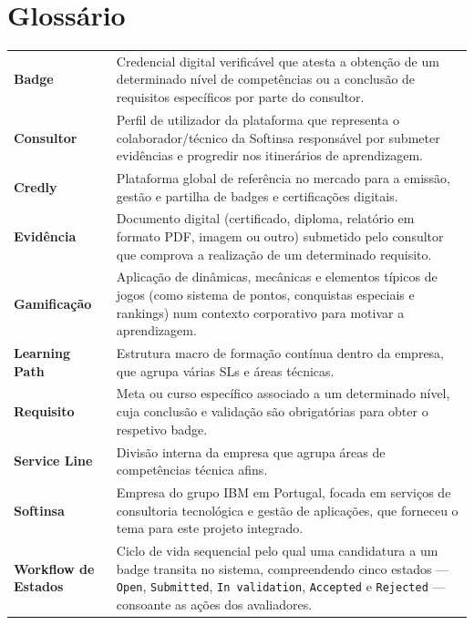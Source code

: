 \documentclass[12pt,a4paper]{report}
\begin{document}
\newpage

\chapter*{Glossário}

\begin{tabularx}{\textwidth}{@{}l@{\hspace{1em}}X@{}}
  \textbf{\color{secondary}Badge}                & Credencial digital verificável que atesta a obtenção de um determinado nível de competências ou a conclusão de requisitos específicos por parte do consultor. \\[6pt]
  \textbf{\color{secondary}Consultor}             & Perfil de utilizador da plataforma que representa o colaborador/técnico da Softinsa responsável por submeter evidências e progredir nos itinerários de aprendizagem. \\[6pt]
  \textbf{\color{secondary}Credly}                & Plataforma global de referência no mercado para a emissão, gestão e partilha de badges e certificações digitais. \\[6pt]
  \textbf{\color{secondary}Evidência}             & Documento digital (certificado, diploma, relatório em formato PDF, imagem ou outro) submetido pelo consultor que comprova a realização de um determinado requisito. \\[6pt]
  \textbf{\color{secondary}Gamificação}           & Aplicação de dinâmicas, mecânicas e elementos típicos de jogos (como sistema de pontos, conquistas especiais e rankings) num contexto corporativo para motivar a aprendizagem. \\[6pt]
  \textbf{\color{secondary}Learning Path}         & Estrutura macro de formação contínua dentro da empresa, que agrupa várias SLs e áreas técnicas. \\[6pt]
  \textbf{\color{secondary}Requisito}             & Meta ou curso específico associado a um determinado nível, cuja conclusão e validação são obrigatórias para obter o respetivo badge. \\[6pt]
  \textbf{\color{secondary}Service Line}          & Divisão interna da empresa que agrupa áreas de competências técnica afins. \\[6pt]
  \textbf{\color{secondary}Softinsa}              & Empresa do grupo IBM em Portugal, focada em serviços de consultoria tecnológica e gestão de aplicações, que forneceu o tema para este projeto integrado. \\[6pt]
  \textbf{\color{secondary}Workflow de Estados}   & Ciclo de vida sequencial pelo qual uma candidatura a um badge transita no sistema, compreendendo cinco estados --- \texttt{Open}, \texttt{Submitted}, \texttt{In validation}, \texttt{Accepted} e \texttt{Rejected} --- consoante as ações dos avaliadores. \\
\end{tabularx}
\end{document}
